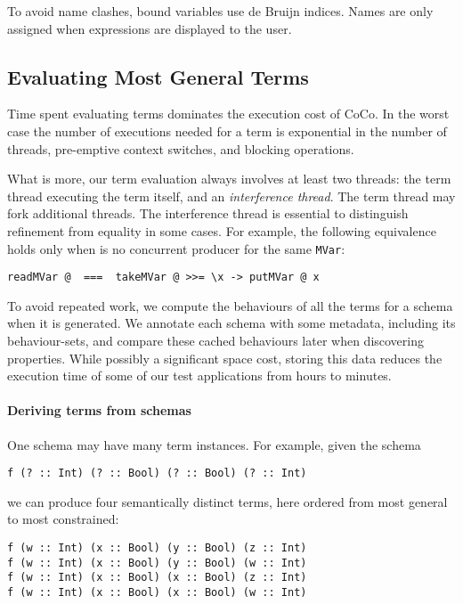 To avoid name clashes, bound variables use de Bruijn
indices\cite{debruijn1972}.  Names are only assigned when expressions
are displayed to the user.

\subsection{Evaluating Most General Terms}
\label{sec:coco-hiw-eval}

Time spent evaluating terms dominates the execution cost of CoCo.  In
the worst case the number of executions needed for a term is
exponential in the number of threads, pre-emptive context switches,
and blocking operations\cite{musuvathi2007}.

What is more, our term evaluation always involves at least two
threads: the term thread executing the term itself, and an
\emph{interference thread}.  The term thread may fork additional
threads.  The interference thread is essential to distinguish
refinement from equality in some cases.  For example, the following
equivalence holds only when is no concurrent producer for the same
\verb|MVar|:

\begin{verbatim}
readMVar @  ===  takeMVar @ >>= \x -> putMVar @ x
\end{verbatim}

To avoid repeated work, we compute the behaviours of all the terms for
a schema when it is generated.  We annotate each schema with some
metadata, including its behaviour-sets, and compare these cached
behaviours later when discovering properties.  While possibly a
significant space cost, storing this data reduces the execution time
of some of our test applications from hours to minutes.

\paragraph{Deriving terms from schemas}
One schema may have many term instances.  For example, given the
schema

\begin{verbatim}
f (? :: Int) (? :: Bool) (? :: Bool) (? :: Int)
\end{verbatim}

\noindent
we can produce four semantically distinct terms, here ordered from
most general to most constrained:

\begin{verbatim}
f (w :: Int) (x :: Bool) (y :: Bool) (z :: Int)
f (w :: Int) (x :: Bool) (y :: Bool) (w :: Int)
f (w :: Int) (x :: Bool) (x :: Bool) (z :: Int)
f (w :: Int) (x :: Bool) (x :: Bool) (w :: Int)
\end{verbatim}

